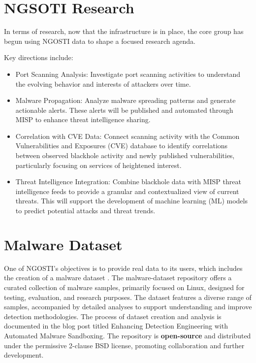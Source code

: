 \section{NGSOTI Research}
In terms of research, now that the infrastructure is in place, the core group
has begun using NGOSTI data to shape a focused research agenda.

Key directions include:

\begin{itemize}
 \item Port Scanning Analysis: Investigate port scanning activities to
 understand the evolving behavior and interests of attackers over time.
 \item Malware Propagation: Analyze malware spreading patterns and
 generate actionable alerts. These alerts will be published and automated
 through MISP to enhance threat intelligence sharing.
 \item Correlation with CVE Data: Connect scanning activity with the
 Common Vulnerabilities and Exposures (CVE) database to identify
 correlations between observed blackhole activity and newly published
 vulnerabilities, particularly focusing on services of heightened interest.
 \item Threat Intelligence Integration: Combine blackhole data with MISP
 threat intelligence feeds to provide a granular and contextualized view
 of current threats. This will support the development of machine
 learning (ML) models to predict potential attacks and threat trends.
 \end{itemize}

\section{Malware Dataset}
One of NGOSTI's objectives is to provide real data to its users, which
includes the creation of a malware dataset \cite{mds}.
The malware-dataset repository
offers a curated collection of malware samples, primarily focused on Linux,
designed for testing, evaluation, and research purposes. The dataset features
a diverse range of samples, accompanied by detailed analyses to support
understanding and improve detection methodologies. The process of dataset
creation and analysis is documented in the blog post titled Enhancing
Detection Engineering with Automated Malware Sandboxing. The repository is
\textbf{open-source} and distributed under the permissive 2-clause BSD license,
promoting collaboration and further development.


